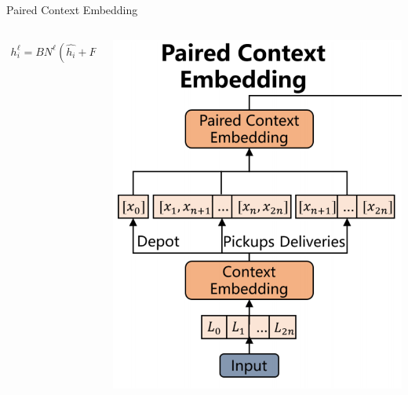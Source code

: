 \documentclass{beamer}
\begin{document}
\begin{frame}{Paired Context Embedding}
\begin{columns}
\begin{column}{0.6\textwidth}
			\begin{align}
				h_{i}^{\ell}=BN^{\ell}(\hat{h_{i}}+FF^{\ell}(\hat{h_{i}})).
			\end{align}
		\end{column}
		\begin{column}{0.4\textwidth}
			\centering
			\includegraphics[width=\textwidth]{PCE.png} %
		\end{column}
	\end{columns}
\end{frame}
\end{document}
